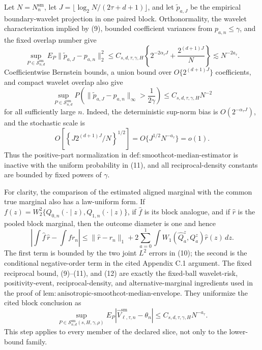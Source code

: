 Let \(N=N_n^{\mathrm{sm}}\), let \(J=\lfloor\log_2N/(2\tau+d+1)\rfloor\), and let \(\widetilde p_{a,J}\) be the empirical boundary-wavelet projection in one paired block. Orthonormality, the wavelet characterization implied by (9), bounded coefficient variances from \(p_{a,n}\le\gamma\), and the fixed overlap number give
\[
\sup_{P\in\mathcal S^{\mathrm{sm}}_{n,d}}
E_P\|\widetilde p_{a,J}-p_{a,n}\|_2^2
\le C_{s,d,\tau,\gamma,H}
\left\{2^{-2\alpha_\tau J}+\frac{2^{(d+1)J}}{N}\right\}
\lesssim N^{-2a_\tau}.
\tag{10}
\]
Coefficientwise Bernstein bounds, a union bound over \(O\{2^{(d+1)J}\}\) coefficients, and compact wavelet overlap also give
\[
\sup_{P\in\mathcal S^{\mathrm{sm}}_{n,d}}
P\!\left(\|\widetilde p_{a,J}-p_{a,n}\|_\infty>\frac{1}{2\gamma}\right)
\le C_{s,d,\tau,\gamma,H}N^{-2}
\tag{11}
\]
for all sufficiently large \(n\). Indeed, the deterministic sup-norm bias is \(O(2^{-\alpha_\tau J})\), and the stochastic scale is
\[
O\!\left[\left\{J2^{(d+1)J}/N\right\}^{1/2}\right]
=O\{J^{1/2}N^{-a_\tau}\}=o(1).
\]
Thus the positive-part normalization in \(\mathrm{def{:}smoothcot\text{-}median\text{-}estimator}\) is inactive with the uniform probability in (11), and all reciprocal-density constants are bounded by fixed powers of \(\gamma\).

For clarity, the comparison of the estimated aligned marginal with the common true marginal also has a law-uniform form. If \(f(z)=W_2^2\{Q_{0,n}(\cdot\mid z),Q_{1,n}(\cdot\mid z)\}\), if \(\widehat f\) is its block analogue, and if \(\widehat r\) is the pooled block marginal, then the outcome diameter is one and hence
\[
\left|\int\widehat f\,\widehat r-\int f r_n\right|
\le\|\widehat r-r_n\|_1
+2\sum_{a=0}^1\int W_1(\widehat Q_a^z,Q_a^z)\widehat r(z)\,dz.
\tag{12}
\]
The first term is bounded by the two joint \(L^2\) errors in (10); the second is the conditional negative-order term in the cited Appendix C.1 argument. The fixed reciprocal bound, (9)--(11), and (12) are exactly the fixed-ball wavelet-risk, positivity-event, reciprocal-density, and alternative-marginal ingredients used in the proof of \(\mathrm{lem{:}anisotropic\text{-}smoothcot\text{-}median\text{-}envelope}\). They uniformize the cited block conclusion as
\[
\sup_{P\in\mathcal S^{\mathrm{sm}}_{n,d}(s,H,\gamma,\rho)}
E_P\left|\widehat V_{\ell,\tau,n}^{\mathrm{sm}}-\theta_n\right|
\le C_{s,d,\tau,\gamma,H}N^{-a_\tau}.
\tag{13}
\]
This step applies to every member of the declared slice, not only to the lower-bound family.

